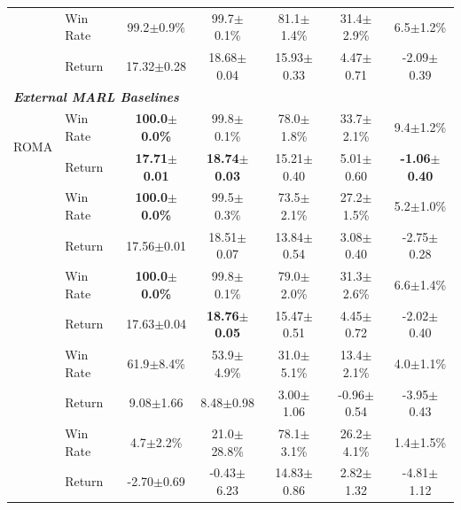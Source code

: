 \begin{table}[htbp]
\begin{tabular}{ll ccccc}
\addlinespace[2pt]
\multirow{2}{*}{MARC (Iter 1)} & Win Rate & 99.2\scriptsize$\pm$0.9\% & 99.7\scriptsize$\pm$0.1\% & 81.1\scriptsize$\pm$1.4\% & 31.4\scriptsize$\pm$2.9\% & 6.5\scriptsize$\pm$1.2\% \\
 & Return & 17.32\scriptsize$\pm$0.28 & 18.68\scriptsize$\pm$0.04 & 15.93\scriptsize$\pm$0.33 & 4.47\scriptsize$\pm$0.71 & -2.09\scriptsize$\pm$0.39 \\
\midrule
\multicolumn{7}{l}{\textit{\textbf{External MARL Baselines}}} \\
\midrule
\multirow{2}{*}{ROMA \citep{wang2020roma}} & Win Rate & \textbf{100.0\scriptsize$\pm$0.0\%} & 99.8\scriptsize$\pm$0.1\% & 78.0\scriptsize$\pm$1.8\% & 33.7\scriptsize$\pm$2.1\% & 9.4\scriptsize$\pm$1.2\% \\
 & Return & \textbf{17.71\scriptsize$\pm$0.01} & \textbf{18.74\scriptsize$\pm$0.03} & 15.21\scriptsize$\pm$0.40 & 5.01\scriptsize$\pm$0.60 & \textbf{-1.06\scriptsize$\pm$0.40} \\
\addlinespace[2pt]
\multirow{2}{*}{RODE \citep{wang2021rode}} & Win Rate & \textbf{100.0\scriptsize$\pm$0.0\%} & 99.5\scriptsize$\pm$0.3\% & 73.5\scriptsize$\pm$2.1\% & 27.2\scriptsize$\pm$1.5\% & 5.2\scriptsize$\pm$1.0\% \\
 & Return & 17.56\scriptsize$\pm$0.01 & 18.51\scriptsize$\pm$0.07 & 13.84\scriptsize$\pm$0.54 & 3.08\scriptsize$\pm$0.40 & -2.75\scriptsize$\pm$0.28 \\
\addlinespace[2pt]
\multirow{2}{*}{MAPPO \citep{yu2022surprising}} & Win Rate & \textbf{100.0\scriptsize$\pm$0.0\%} & 99.8\scriptsize$\pm$0.1\% & 79.0\scriptsize$\pm$2.0\% & 31.3\scriptsize$\pm$2.6\% & 6.6\scriptsize$\pm$1.4\% \\
 & Return & 17.63\scriptsize$\pm$0.04 & \textbf{18.76\scriptsize$\pm$0.05} & 15.47\scriptsize$\pm$0.51 & 4.45\scriptsize$\pm$0.72 & -2.02\scriptsize$\pm$0.40 \\
\addlinespace[2pt]
\multirow{2}{*}{H-MAPPO \citep{vezhnevets2017feudal}} & Win Rate & 61.9\scriptsize$\pm$8.4\% & 53.9\scriptsize$\pm$4.9\% & 31.0\scriptsize$\pm$5.1\% & 13.4\scriptsize$\pm$2.1\% & 4.0\scriptsize$\pm$1.1\% \\
 & Return & 9.08\scriptsize$\pm$1.66 & 8.48\scriptsize$\pm$0.98 & 3.00\scriptsize$\pm$1.06 & -0.96\scriptsize$\pm$0.54 & -3.95\scriptsize$\pm$0.43 \\
\addlinespace[2pt]
\multirow{2}{*}{COMA \citep{foerster2018counterfactual}} & Win Rate & 4.7\scriptsize$\pm$2.2\% & 21.0\scriptsize$\pm$28.8\% & 78.1\scriptsize$\pm$3.1\% & 26.2\scriptsize$\pm$4.1\% & 1.4\scriptsize$\pm$1.5\% \\
 & Return & -2.70\scriptsize$\pm$0.69 & -0.43\scriptsize$\pm$6.23 & 14.83\scriptsize$\pm$0.86 & 2.82\scriptsize$\pm$1.32 & -4.81\scriptsize$\pm$1.12 \\
\bottomrule
\end{tabular}
\end{table}

